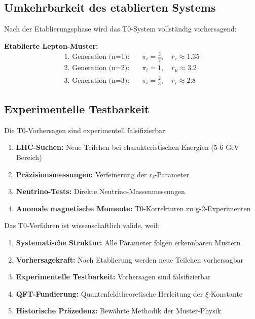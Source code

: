 \documentclass[12pt,a4paper]{article}
\begin{document}
	\subsection{Umkehrbarkeit des etablierten Systems}
	\label{subsec:umkehrbarkeit}
	
	Nach der Etablierungsphase wird das T0-System vollständig vorhersagend:
	
	\textbf{Etablierte Lepton-Muster:}
	\begin{align}
		\text{1. Generation (n=1):} \quad &\pi_i = \frac{3}{2}, \quad r_e \approx 1.35 \\
		\text{2. Generation (n=2):} \quad &\pi_i = 1, \quad r_\mu \approx 3.2 \\
		\text{3. Generation (n=3):} \quad &\pi_i = \frac{2}{3}, \quad r_\tau \approx 2.8
	\end{align}
	
	\subsection{Experimentelle Testbarkeit}
	\label{subsec:experimentelle_testbarkeit}
	
	Die T0-Vorhersagen sind experimentell falsifizierbar:
	
	\begin{enumerate}
		\item \textbf{LHC-Suchen:} Neue Teilchen bei charakteristischen Energien (5-6 GeV Bereich)
		\item \textbf{Präzisionsmessungen:} Verfeinerung der $r_i$-Parameter
		\item \textbf{Neutrino-Tests:} Direkte Neutrino-Massenmessungen
		\item \textbf{Anomale magnetische Momente:} T0-Korrekturen zu g-2-Experimenten
	\end{enumerate}
	
	Das T0-Verfahren ist wissenschaftlich valide, weil:
	
	\begin{enumerate}
		\item \textbf{Systematische Struktur:} Alle Parameter folgen erkennbaren Mustern
		\item \textbf{Vorhersagekraft:} Nach Etablierung werden neue Teilchen vorhersagbar
		\item \textbf{Experimentelle Testbarkeit:} Vorhersagen sind falsifizierbar
		\item \textbf{QFT-Fundierung:} Quantenfeldtheoretische Herleitung der $\xi$-Konstante
		\item \textbf{Historische Präzedenz:} Bewährte Methodik der Muster-Physik
	\end{enumerate}
	
\end{document}
